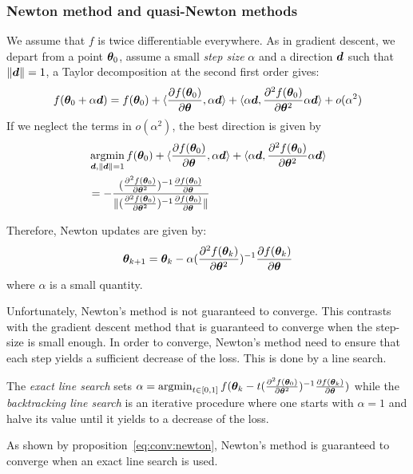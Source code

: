 \subsubsection{Newton method and quasi-Newton methods}
\label{sec:qn}
We assume that $f$ is twice differentiable everywhere.
As in gradient descent, we depart from a point $\thetab_0$, assume a small \emph{step size} $\alpha$ and a direction
$\db$ such that $\|\db\| = 1$, a Taylor decomposition at the second first order gives:
\begin{align}
  f(\thetab_0 + \alpha \db) = f(\thetab_0) + \dotp{ \partialfrac{\thetab}{f(\thetab_0)} }{ \alpha \db } + \dotp{ \alpha \db }{ \partialfrac{\thetab^2}{^2 f(\thetab_0)} \alpha \db } + o(\alpha^2) 
\end{align}
If we neglect the terms in $o(\alpha^2)$, the best direction is given by
\begin{align}
  &\argmin_{\db, \|\db\| = 1} f(\thetab_0) + \dotp{ \partialfrac{\thetab}{f(\thetab_0)} }{ \alpha \db } + \dotp{ \alpha \db }{ \partialfrac{\thetab^2}{^2 f(\thetab_0)} \alpha \db } \\
  &= - \frac{(\partialfrac{\thetab^2}{^2 f(\thetab_0)})^{-1}\partialfrac{\thetab}{f(\thetab_0)}}{\| (\partialfrac{\thetab^2}{^2 f(\thetab_0)})^{-1} \partialfrac{\thetab}{f(\thetab_0)}\|}
\end{align}


Therefore, Newton updates are given by:
\begin{align}
  \thetab_{k+1} = \thetab_k -\alpha (\partialfrac{\thetab^2}{^2 f(\thetab_k)})^{-1} \partialfrac{\thetab}{f(\thetab_k)} \label{eq:update:newton}
\end{align}
where $\alpha$ is a small quantity.

Unfortunately, Newton's method is not guaranteed to converge. This contrasts with the gradient descent method that is guaranteed to converge when the step-size is small enough.
In order to converge, Newton's method need to ensure that each step yields a sufficient decrease of the loss. This is done by a line search.

The \emph{exact line search} sets $\alpha = \argmin_{t \in [0, 1]} f(\thetab_k - t
(\partialfrac{\thetab^2}{^2 f(\thetab_0)})^{-1} \partialfrac{\thetab}{f(\thetab_k)})$ while the \emph{backtracking line search} is an iterative procedure where one starts with $\alpha=1$ and halve its value until it yields to a decrease of the loss.

As shown by proposition~\ref{eq:conv:newton}, Newton's method is guaranteed to converge when an
exact line search is used.

